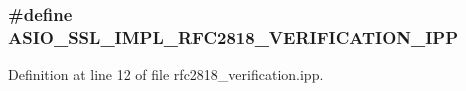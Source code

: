 \subsubsection[{A\+S\+I\+O\+\_\+\+S\+S\+L\+\_\+\+I\+M\+P\+L\+\_\+\+R\+F\+C2818\+\_\+\+V\+E\+R\+I\+F\+I\+C\+A\+T\+I\+O\+N\+\_\+\+I\+P\+P}]{\setlength{\rightskip}{0pt plus 5cm}\#define A\+S\+I\+O\+\_\+\+S\+S\+L\+\_\+\+I\+M\+P\+L\+\_\+\+R\+F\+C2818\+\_\+\+V\+E\+R\+I\+F\+I\+C\+A\+T\+I\+O\+N\+\_\+\+I\+P\+P}\label{rfc2818__verification_8ipp_addbf67b60d8d732ad04209951b03c0f3}


Definition at line 12 of file rfc2818\+\_\+verification.\+ipp.


